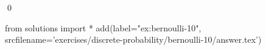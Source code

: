 
\begin{ex} 
  \label{ex:bernoulli-10}
  
  \qed
\end{ex} 
\begin{python0}
from solutions import *
add(label="ex:bernoulli-10",
    srcfilename='exercises/discrete-probability/bernoulli-10/answer.tex') 
\end{python0}
